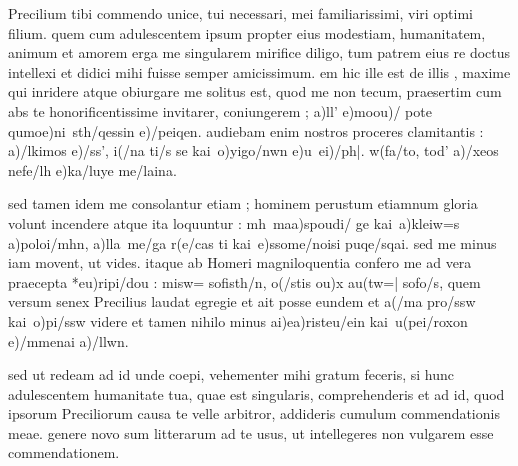 


 Precilium tibi commendo unice, tui necessari, mei familiarissimi, viri optimi filium. quem cum adulescentem ipsum propter eius modestiam, humanitatem, animum et amorem erga me singularem mirifice diligo, tum patrem eius re doctus intellexi et didici mihi fuisse semper amicissimum. em hic ille est de illis , maxime qui inridere atque obiurgare me solitus est, quod me non tecum, praesertim cum abs te honorificentissime invitarer, coniungerem ; a)ll' e)mo\n ou)/ pote qumo\n e)ni\ sth/qessin e)/peiqen. audiebam enim nostros proceres clamitantis : a)/lkimos e)/ss', i(/na ti/s se kai\ o)yigo/nwn e)u\ ei)/ph|. w(\s fa/to, to\n d' a)/xeos nefe/lh e)ka/luye me/laina.

 sed tamen idem me consolantur etiam ; hominem perustum etiamnum gloria volunt incendere atque ita loquuntur : mh\ ma\n a)spoudi/ ge kai\ a)kleiw=s a)poloi/mhn, a)lla\ me/ga r(e/cas ti kai\ e)ssome/noisi puqe/sqai. sed me minus iam movent, ut vides. itaque ab Homeri magniloquentia confero me ad vera praecepta *eu)ripi/dou : misw= sofisth/n, o(/stis ou)x au(tw=| sofo/s, quem versum senex Precilius laudat egregie et ait posse eundem et a(/ma pro/ssw kai\ o)pi/ssw videre et tamen nihilo minus ai)e\n a)risteu/ein kai\ u(pei/roxon e)/mmenai a)/llwn.

 sed ut redeam ad id unde coepi, vehementer mihi gratum feceris, si hunc adulescentem humanitate tua, quae est singularis, comprehenderis et ad id, quod ipsorum Preciliorum causa te velle arbitror, addideris cumulum commendationis meae. genere novo sum litterarum ad te usus, ut intellegeres non vulgarem esse commendationem.
